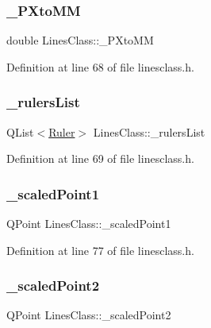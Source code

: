 \subsubsection{\texorpdfstring{\_PXtoMM}{\_PXtoMM}}
{\footnotesize\ttfamily double Lines\+Class\+::\+\_\+\+P\+Xto\+MM\hspace{0.3cm}{\ttfamily [private]}}



Definition at line 68 of file linesclass.\+h.

\mbox{\label{classLinesClass_a433f7193cb50a8372c7c02289b0416d8}} 
\subsubsection{\texorpdfstring{\_rulersList}{\_rulersList}}
{\footnotesize\ttfamily Q\+List$<$\mbox{\hyperlink{classRuler}{Ruler}}$>$ Lines\+Class\+::\+\_\+rulers\+List\hspace{0.3cm}{\ttfamily [private]}}



Definition at line 69 of file linesclass.\+h.

\mbox{\label{classLinesClass_aaac1333fecbdb6682e43e6d2bfdcb4b3}} 
\subsubsection{\texorpdfstring{\_scaledPoint1}{\_scaledPoint1}}
{\footnotesize\ttfamily Q\+Point Lines\+Class\+::\+\_\+scaled\+Point1\hspace{0.3cm}{\ttfamily [private]}}



Definition at line 77 of file linesclass.\+h.

\mbox{\label{classLinesClass_ab9573e0491994cddee75df125e66d037}} 
\subsubsection{\texorpdfstring{\_scaledPoint2}{\_scaledPoint2}}
{\footnotesize\ttfamily Q\+Point Lines\+Class\+::\+\_\+scaled\+Point2\hspace{0.3cm}{\ttfamily [private]}}



